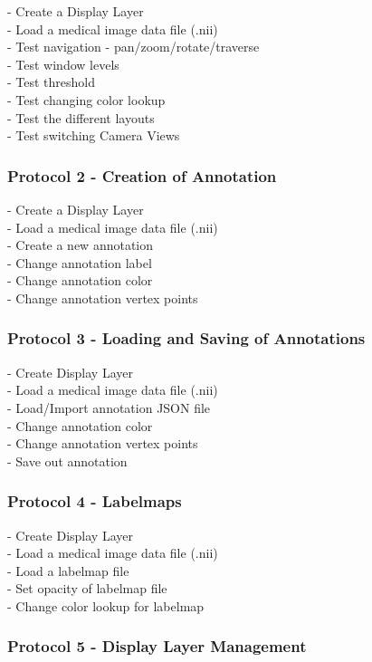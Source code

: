 \documentclass[a4paper,11pt,twoside]{article}
\begin{document}
- Create a Display Layer\\
- Load a medical image data file (.nii)\\
- Test navigation - pan/zoom/rotate/traverse\\
- Test window levels\\
- Test threshold\\
- Test changing color lookup\\
- Test the different layouts\\
- Test switching Camera Views

\subsubsection*{Protocol 2 - Creation of Annotation }

- Create a Display Layer\\
- Load a medical image data file (.nii)\\
- Create a new annotation\\
- Change annotation label\\
- Change annotation color\\
- Change annotation vertex points

\subsubsection*{Protocol 3 - Loading and Saving of Annotations }

- Create Display Layer\\
- Load a medical image data file (.nii)\\
- Load/Import annotation JSON file\\
- Change annotation color\\
- Change annotation vertex points\\
- Save out annotation


\subsubsection*{Protocol 4 - Labelmaps }

- Create Display Layer\\
- Load a medical image data file (.nii)\\
- Load a labelmap file\\
- Set opacity of labelmap file\\
- Change color lookup for labelmap

\subsubsection*{Protocol 5 - Display Layer Management }
\end{document}
